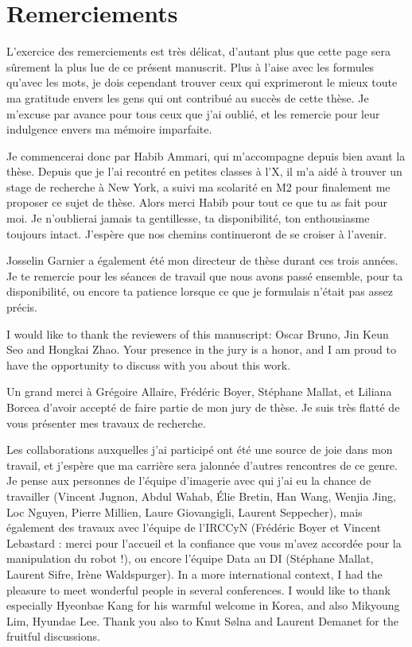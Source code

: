 \chapter*{Remerciements}

L'exercice des remerciements est très délicat, d'autant plus que cette page
sera sûrement la plus lue de ce présent manuscrit.
Plus à l'aise avec les formules
qu'avec les mots, je dois cependant trouver ceux qui exprimeront le mieux toute
ma gratitude envers les gens qui ont contribué au succès de cette thèse. Je
m'excuse par avance pour tous ceux que j'ai oublié, et les remercie pour leur
indulgence envers ma mémoire imparfaite.

Je commencerai donc par Habib Ammari, qui m'accompagne depuis bien avant la thèse.
Depuis que je l'ai recontré en petites classes à l'X, il m'a aidé à trouver un
stage de recherche à New York, a suivi ma scolarité en M2 pour finalement me 
proposer ce sujet de thèse. Alors merci Habib pour tout ce que tu as fait pour
moi. Je n'oublierai jamais ta gentillesse, ta disponibilité, ton enthousiasme
toujours intact. J'espère que nos chemins continueront de se croiser à l'avenir.

Josselin Garnier a également été mon directeur de thèse durant ces trois années.
Je te remercie pour les séances de travail que nous avons passé ensemble, pour
ta disponibilité, ou encore ta patience lorsque ce que je formulais n'était pas 
assez précis.

I would like to thank the reviewers of this manuscript: Oscar Bruno, Jin Keun
Seo and Hongkai Zhao. Your presence in the jury is a honor, and I am proud
to have the opportunity to discuss with you about this work.

Un grand merci à Grégoire Allaire, Frédéric Boyer, Stéphane Mallat, et Liliana
Borcea d'avoir accepté de faire partie de mon jury de thèse. Je suis très
flatté de vous présenter mes travaux de recherche.

Les collaborations auxquelles j'ai participé ont été une source de joie dans
mon travail, et j'espère que ma carrière sera jalonnée d'autres rencontres de
ce genre. Je pense aux personnes de l'équipe d'imagerie avec qui j'ai eu la
chance de travailler (Vincent Jugnon, Abdul Wahab, Élie Bretin, Han Wang, Wenjia
Jing, Loc Nguyen, Pierre Millien, Laure Giovangigli, Laurent Seppecher), mais
également des travaux avec l'équipe de l'IRCCyN (Frédéric Boyer et Vincent
Lebastard : merci pour l'accueil et la confiance que vous m'avez accordée pour
la manipulation du robot !), ou encore l'équipe Data au DI (Stéphane Mallat,
Laurent Sifre, Irène Waldspurger). In a more international context, I had the
pleasure to meet wonderful people in several conferences. I would like to thank
especially Hyeonbae Kang for his warmful welcome in Korea, and also Mikyoung Lim,
Hyundae Lee. Thank you also to Knut S\o lna and Laurent Demanet for the fruitful
discussions.


